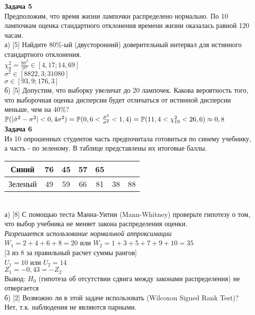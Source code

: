 \documentclass[pdftex,12pt,a4paper]{article}
\begin{document}
{\bf Задача 5} \\
Предположим, что время жизни лампочки распределено нормально. По
10 лампочкам оценка стандартного отклонения времени жизни
оказалась равной 120 часам. \\
а) [5] Найдите 80\%-ый (двусторонний)
доверительный интервал для истинного стандартного отклонения. \\
$\chi_{9}^{2}=\frac{9\hat{\sigma}^{2}}{\sigma^{2}} \in [4,17;14,69]$ \\
$\sigma^{2} \in [8822,3;31080]$ \\
$\sigma \in [93,9;176,3] $ \\
б) [5] Допустим, что выборку увеличат до 20 лампочек. Какова
вероятность того, что выборочная оценка дисперсии будет отличаться
от истинной дисперсии меньше, чем на 40\%? \\
$\P(|\hat{\sigma}^{2}-\sigma^{2}|<0,4\sigma^{2})=
\P(0,6<\frac{\hat{\sigma}^{2}}{\sigma^{2}}<1,4)=
\P(11,4<\chi_{19}^{2}<26,6)\approx 0,8$ \\


{\bf Задача 6} \\
Из 10 опрошенных студентов часть предпочитала готовиться по синему
учебнику, а часть - по зеленому. В таблице представлены их
итоговые баллы.  \\
\begin{tabular}{|c|c|c|c|c|c|c|}
  \hline
  Синий & 76 & 45 & 57 & 65 &  &  \\
  \hline
  Зеленый & 49 & 59 & 66 & 81 & 38 & 88 \\
  \hline
\end{tabular} \\
а) [8] С помощью теста Манна-Уитни (Mann-Whitney) проверьте
гипотезу о
том, что выбор учебника не меняет закона распределения оценки. \\
\emph{Разрешается использование нормальной аппроксимации} \\
$W_{1}=2+4+6+8=20$ или $W_{2}=1+3+5+7+9+10=35$ \\
$[$3 из 8 за правильный расчет суммы рангов$]$ \\
$U_{1}=10$ или $U_{2}=14$ \\
$Z_{1}=-0,43=-Z_{2}$ \\
Вывод: $H_{0}$ (гипотеза об отсутствии сдвига между законами
распределения) не отвергается \\
б) [2] Возможно ли в этой задаче использовать (Wilcoxon Signed Rank Test)? \\
Нет, т.к. наблюдения не являются парными. \\
\end{document}
